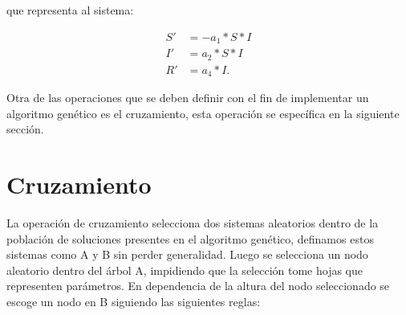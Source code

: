\begin{center}
\begin{adjustbox}{width=0.5\textwidth, keepaspectratio}
    \end{adjustbox}
\end{center}

que representa al sistema:

\begin{align*}
    S' & = - a_1 * S * I \\
    I' & = a_2 * S * I   \\
    R' & = a_4 * I.
\end{align*}

Otra de las operaciones que se deben definir con el fin de implementar un algoritmo genético es el cruzamiento, esta operación se específica en la siguiente sección.

\section{Cruzamiento}

La operación de cruzamiento selecciona dos sistemas aleatorios dentro de la población de soluciones presentes en el algoritmo genético, definamos estos sistemas como A y B sin perder generalidad. Luego se selecciona un nodo aleatorio dentro del árbol A, impidiendo que la selección tome hojas que representen parámetros. En dependencia de la altura del nodo seleccionado se escoge un nodo en B siguiendo las siguientes reglas:

